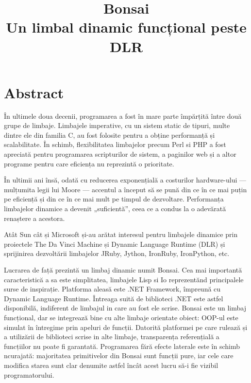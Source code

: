 \documentclass[12pt,a4paper]{memoir}
\title{Bonsai\\Un limbal dinamic funcțional peste DLR}
\begin{document}
\maketitle
\tableofcontents

\chapter{Abstract}

În ultimele doua decenii, programarea a fost în mare parte împărțită între două grupe de limbaje. Limbajele imperative, cu un sistem static de tipuri, multe dintre ele din familia C, au fost folosite pentru a obține performanță și scalabilitate. În schimb, flexibilitatea limbajelor precum Perl si PHP a fost apreciată pentru programarea scripturilor de sistem, a paginilor web și a altor programe pentru care eficiența nu reprezintă o prioritate.

În ultimii ani însă, odată cu reducerea exponențială a costurilor hardware-ului — mulțumita legii lui Moore — accentul a început să se pună din ce în ce mai puțin pe eficiență și din ce în ce mai mult pe timpul de dezvoltare. Performanța limbajelor dinamice a devenit „suficientă”, ceea ce a condus la o adevărată renaștere a acestora.

Atât Sun cât și Microsoft și-au arătat interesul pentru limbajele dinamice prin proiectele The Da Vinci Machine\cite{daVinciMachine} și Dynamic Language Runtime (DLR)\cite{dlr} și sprijinirea dezvoltării limbajelor JRuby\cite{jruby}, Jython\cite{jython}, IronRuby\cite{ironruby}, IronPython\cite{ironpython}, etc.

Lucrarea de față prezintă un limbaj dinamic numit Bonsai. Cea mai importantă caracteristică a sa este simplitatea, limbajele Lisp si Io \cite{io} reprezentănd principalele surse de inspirație. Platforma aleasă este .NET Framework, împreună cu Dynamic Language Runtime. Întreaga suită de biblioteci .NET este astfel disponibilă, indiferent de limbajul in care au fost ele scrise. Bonsai este un limbaj funcțional, dar se integrează bine cu alte limbaje orientate obiect: OOP-ul este simulat în întregime prin apeluri de funcții. Datorită platformei pe care rulează și a utilizării de biblioteci scrise in alte limbaje, transparența referențială a funcțiilor nu poate fi garantată. Programarea fără efecte laterale este în schimb      ncurajată: majoritatea primitivelor din Bonsai sunt funcții pure, iar cele care modifica starea sunt clar denumite astfel încât acest lucru să-i fie vizibil programatorului.
\end{document}
